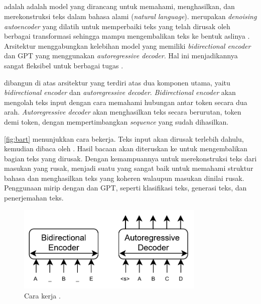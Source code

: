 \subsection{\bartfull}
\label{subsec:bart}

\bartfull{} adalah adalah model \ml{} yang dirancang untuk memahami, menghasilkan, dan merekonstruksi teks dalam bahasa alami (\emph{natural language}). \bart{} merupakan \emph{denoising autoencoder} yang dilatih untuk memperbaiki teks yang telah dirusak oleh berbagai transformasi sehingga mampu mengembalikan teks ke bentuk aslinya \parencite{lewis2019bart}. Arsitektur \bart{} menggabungkan kelebihan model \bert{} yang memiliki \emph{bidirectional encoder} dan GPT yang menggunakan \emph{autoregressive decoder}. Hal ini menjadikannya sangat fleksibel untuk berbagai tugas \nlpfull.

\bart{} dibangun di atas arsitektur \transformer{} yang terdiri atas dua 
komponen utama, yaitu \emph{bidirectional encoder} dan \textit{autoregressive decoder}. \emph{Bidirectional encoder} akan mengolah teks input dengan cara memahami hubungan antar token secara dua arah. \emph{Autoregressive decoder} akan menghasilkan teks secara berurutan, token demi token, dengan mempertimbangkan \emph{sequence} yang sudah dihasilkan.

\autoref{fig:bart} menunjukkan cara \bart{} bekerja. Teks input akan dirusak terlebih dahulu, kemudian dibaca oleh \encoder. Hasil bacaan \encoder{} akan diteruskan ke \decoder{} untuk mengembalikan bagian teks yang dirusak. Dengan kemampuannya untuk merekonstruksi teks dari masukan yang rusak, \bart{} menjadi suatu \transformer{} yang sangat baik untuk memahami struktur bahasa dan menghasilkan teks yang koheren walaupun masukan dinilai rusak. Penggunaan \bart{} mirip dengan \bert{} dan GPT, seperti klasifikasi teks, generasi teks, dan penerjemahan teks.

\begin{figure}
\centering
\includegraphics[width=0.8\textwidth]{images/bart.png}
\caption{Cara kerja \bart{} \parencite{lewis2019bart}.}
\label{fig:bart}
\end{figure}


